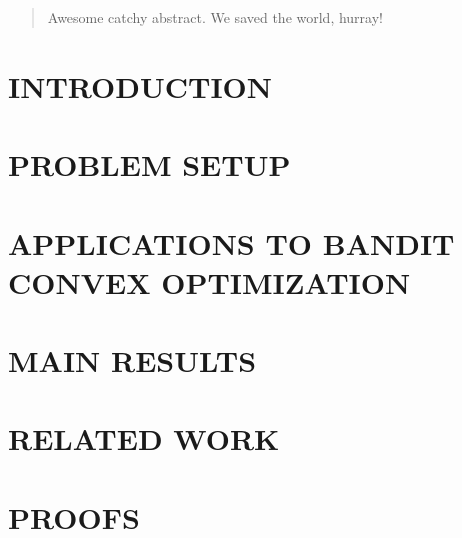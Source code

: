 \documentclass[twoside]{article}
\begin{document}
%

%



\begin{abstract}
	Awesome catchy abstract. We saved the world, hurray!
\end{abstract}

\section{INTRODUCTION}
\label{sec:intro}


\section{PROBLEM SETUP}
\label{sec:problem}


\section{APPLICATIONS TO BANDIT CONVEX OPTIMIZATION}
\label{sec:ex}


\section{MAIN RESULTS}
\label{sec:results}


\section{RELATED WORK}
\label{sec:related}


\section{PROOFS}
\label{sec:proofs}



\end{document}
